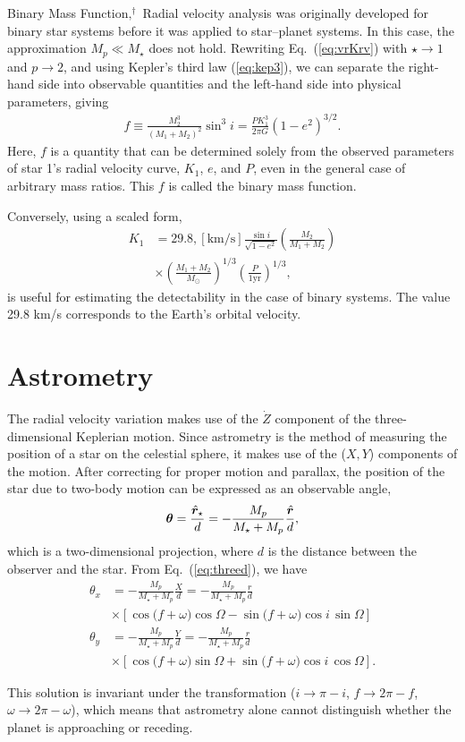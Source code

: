 \begin{itembox}{Binary Mass Function$,^\dagger$}
\footnotesize
\color{gray}
Radial velocity analysis was originally developed for binary star systems before it was applied to star–planet systems. In this case, the approximation $M_p \ll M_\star$ does not hold. Rewriting Eq.~(\ref{eq:vrKrv}) with $\star \to 1$ and $p \to 2$, and using Kepler’s third law (\ref{eq:kep3}), we can separate the right-hand side into observable quantities and the left-hand side into physical parameters, giving
\begin{align}
\label{eq:bmfunc}
f \equiv \frac{M_2^3}{(M_1 + M_2)^2} \sin^3{i} = \frac{P K_1^3}{2 \pi G} (1 - e^2)^{3/2} .
\end{align}
Here, $f$ is a quantity that can be determined solely from the observed parameters of star 1’s radial velocity curve, $K_1$, $e$, and $P$, even in the general case of arbitrary mass ratios. This $f$ is called the binary mass function.

Conversely, using a scaled form,
\begin{align}
\label{eq:semiamp2}
K_1 &= 29.8 , [\mathrm{km/s}] \frac{\sin{i}}{\sqrt{1 - e^2}} \left( \frac{M_2}{M_1 + M_2} \right) \nonumber \\
&\times \left( \frac{M_1 + M_2}{M_\odot} \right)^{1/3} \left( \frac{P}{1 \mathrm{yr}} \right)^{1/3} ,
\end{align}
is useful for estimating the detectability in the case of binary systems. The value 29.8 km/s corresponds to the Earth’s orbital velocity.
\end{itembox}


\section{Astrometry}

The radial velocity variation makes use of the $\dot{Z}$ component of the three-dimensional Keplerian motion. Since astrometry is the method of measuring the position of a star on the celestial sphere, it makes use of the ($X,Y$) components of the motion. After correcting for proper motion and parallax, the position of the star due to two-body motion can be expressed as an observable angle,
\begin{align}
{\boldsymbol{\theta}} = \frac{\hat{\boldsymbol{r}}_\star}{d} = - \frac{M_p}{M_\star + M_p} \frac{\hat{\boldsymbol{r}}}{d} ,
\end{align}
which is a two-dimensional projection, where $d$ is the distance between the observer and the star. From Eq.~(\ref{eq:threed}), we have
\begin{align}
\theta_x &= - \frac{M_p}{M_\star + M_p} \frac{X}{d} = - \frac{M_p}{M_\star + M_p} \frac{r}{d} \nonumber\\
&\times [\cos \bigl(f+\omega\bigr)\cos\Omega
- \sin \bigl(f+\omega\bigr)\cos i \, \sin\Omega] \\
\theta_y &= - \frac{M_p}{M_\star + M_p} \frac{Y}{d} =- \frac{M_p}{M_\star + M_p}\frac{r}{d} \nonumber\\
&\times [ \cos \bigl(f+\omega\bigr) \sin\Omega 
+ \sin \bigl(f+\omega\bigr)\cos i \,\cos\Omega] .
\end{align}

This solution is invariant under the transformation ($i \to \pi - i$, $f \to 2 \pi - f$, $\omega \to 2 \pi - \omega$), which means that astrometry alone cannot distinguish whether the planet is approaching or receding.